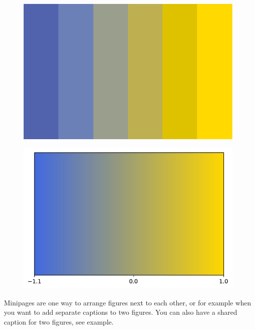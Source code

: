 \documentclass[main_brownies.tex]{subfiles}
\begin{document}
\begin{figure}[tbh]
	\begin{minipage}[t]{0.5\textwidth}
		\includegraphics[width=\textwidth]{6colors.pdf}
		\label{fig:left}    
	\end{minipage}%
	\hfill
	\begin{minipage}[t]{0.5\textwidth}
		\includegraphics[width=\textwidth]{test3.pdf}
		\label{fig:right}
	\end{minipage}%
\end{figure}%
Minipages are one way to arrange figures next to each other, or for example when you want to add separate captions to two figures. You can also have a shared caption for two figures, see example.
\end{document}
